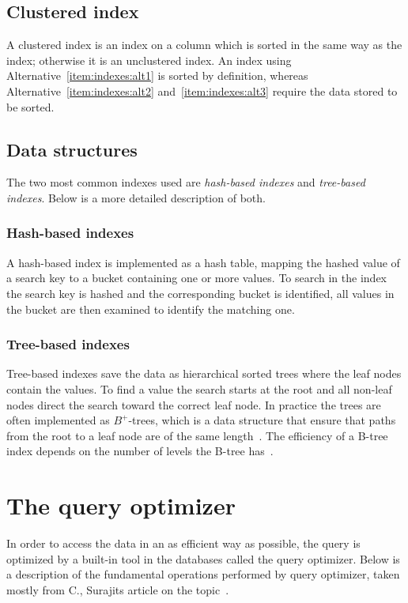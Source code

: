 \subsection{Clustered index}
A clustered index is an index on a column which is sorted in the same way as the
index; otherwise it is an unclustered index. An index using
Alternative~\ref{item:indexes:alt1} is sorted by definition, whereas
Alternative~\ref{item:indexes:alt2} and~\ref{item:indexes:alt3} require the data
stored to be sorted.

\subsection{Data structures}
The two most common indexes used are \textit{hash-based indexes} and
\textit{tree-based indexes}. Below is a more detailed description of both.

\subsubsection{Hash-based indexes}
A hash-based index is implemented as a hash table, mapping the hashed value of a
search key to a bucket containing one or more values. To search in the index the
search key is hashed and the corresponding bucket is identified, all values in
the bucket are then examined to identify the matching one.

\subsubsection{Tree-based indexes}
Tree-based indexes save the data as hierarchical sorted trees where the leaf
nodes contain the values. To find a value the search starts at the root and all
non-leaf nodes direct the search toward the correct leaf node. In practice the
trees are often implemented as $B^{+}$-trees, which is a data structure that
ensure that paths from the root to a leaf node are of the same
length~\cite{comer_1979_ubiquitous_ub}. The efficiency of a B-tree index depends
on the number of levels the B-tree has~\cite[p.
645]{garcia-molina_2002_database_dstcb}.

\section{The query optimizer}\label{sec:queryopt}
In order to access the data in an as efficient way as possible, the query is
optimized by a built-in tool in the databases called the query optimizer. Below
is a description of the fundamental operations performed by query optimizer,
taken mostly from C., Surajits article on the
topic~\cite{chaudhuri_1998_overview_aooqoirs}.


